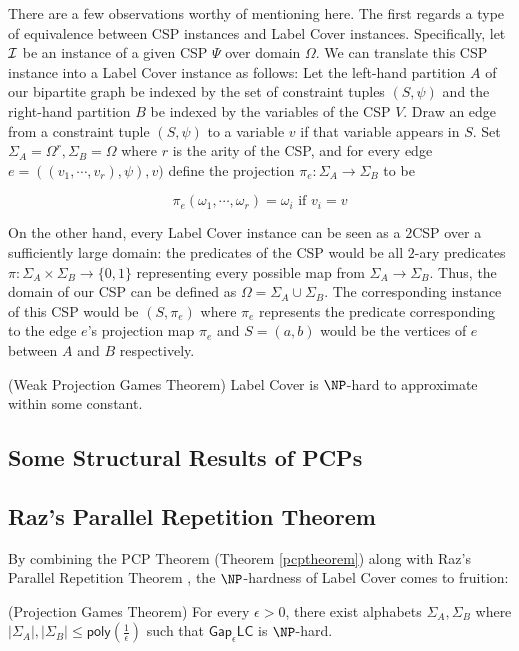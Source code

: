There are a few observations worthy of mentioning here. The first regards a type of equivalence between CSP instances and Label Cover instances. Specifically, let $\mathcal{I}$ be an instance of a given CSP $\Psi$ over domain $\Omega$. We can translate this CSP instance into a Label Cover instance as follows: Let the left-hand partition $A$ of our bipartite graph be indexed by the set of constraint tuples $(S,\psi)$ and the right-hand partition $B$ be indexed by the variables of the CSP $V$. Draw an edge from a constraint tuple $(S,\psi)$ to a variable $v$ if that variable appears in $S$. Set $\Sigma_A = \Omega^r, \Sigma_B = \Omega$ where $r$ is the arity of the CSP, and for every edge $e = ((v_1,\cdots,v_r), \psi), v)$ define the projection $\pi_e:\Sigma_A \rightarrow \Sigma_B$ to be

\[ \pi_e(\omega_1, \cdots, \omega_r) =  \omega_i \text{ if } v_i = v\]\newline


On the other hand, every Label Cover instance can be seen as a $2$CSP over a sufficiently large domain: the predicates of the CSP would be all $2$-ary predicates $\pi:\Sigma_A \times \Sigma_B \rightarrow \{0,1\}$ representing every possible map from $\Sigma_A \rightarrow \Sigma_B$. Thus, the domain of our CSP can be defined as $\Omega = \Sigma_A \cup \Sigma_B$. The corresponding instance of this CSP would be $(S,\pi_e)$ where $\pi_e$ represents the predicate corresponding to the edge $e$'s projection map $\pi_e$ and $S = (a,b)$ would be the vertices of $e$ between $A$ and $B$ respectively.

\begin{theorem} (Weak Projection Games Theorem)
Label Cover is $\NP$-hard to approximate within some constant.
\end{theorem}


\subsection{Some Structural Results of PCPs}


\subsection{Raz's Parallel Repetition Theorem}
By combining the PCP Theorem (Theorem \ref{pcptheorem}) along with Raz's Parallel Repetition Theorem \cite{raz1998parallel}, the $\NP$-hardness of Label Cover comes to fruition:

\begin{theorem} (Projection Games Theorem) \label{labelcoverhard}
  For every $\epsilon > 0$, there exist alphabets $\Sigma_A, \Sigma_B$ where $|\Sigma_A|,|\Sigma_B| \leq \mathsf{poly}(\frac{1}{\epsilon})$ such that $\mathsf{Gap}_\epsilon\mathsf{LC}$ is $\NP$-hard.
\end{theorem}

